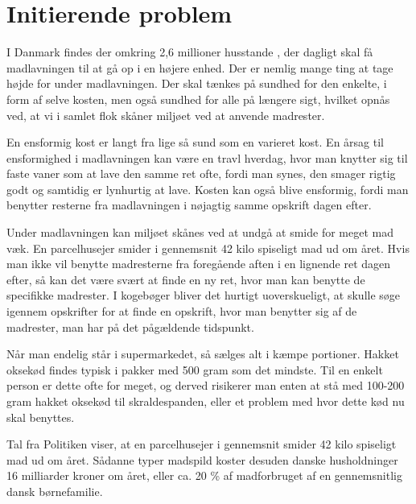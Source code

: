 \section{Initierende problem}
\label{sec:initierendeproblem}

I Danmark findes der omkring 2,6 millioner husstande \cite{husstande}, der dagligt skal få madlavningen til at gå op i en højere enhed. Der er nemlig mange ting at tage højde for under madlavningen. Der skal tænkes på sundhed for den enkelte, i form af selve kosten, men også sundhed for alle på længere sigt, hvilket opnås ved, at vi i samlet flok skåner miljøet ved at anvende madrester.

En ensformig kost er langt fra lige så sund som en varieret kost. En årsag til ensformighed i madlavningen kan være en travl hverdag, hvor man knytter sig til faste vaner som \fx at lave den samme ret ofte, fordi man synes, den smager rigtig godt og samtidig er lynhurtig at lave. Kosten kan også blive ensformig, fordi man benytter resterne fra madlavningen i nøjagtig samme opskrift dagen efter.

Under madlavningen kan miljøet skånes ved at undgå at smide for meget mad væk. En parcelhusejer smider i gennemsnit 42 kilo spiseligt mad ud om året. \cite{madspildpol} Hvis man ikke vil benytte madresterne fra foregående aften i en lignende ret dagen efter, så kan det være svært at finde en ny ret, hvor man kan benytte de specifikke madrester. I kogebøger bliver det hurtigt uoverskueligt, at skulle søge igennem opskrifter for at finde en opskrift, hvor man benytter sig af de madrester, man har på det pågældende tidspunkt. 

Når man endelig står i supermarkedet, så sælges alt i kæmpe portioner. Hakket oksekød findes typisk i pakker med 500 gram som det mindste. Til en enkelt person er dette ofte for meget, og derved risikerer man enten at stå med 100-200 gram hakket oksekød til skraldespanden, eller et problem med hvor dette kød nu skal benyttes.

Tal fra Politiken viser, at en parcelhusejer i gennemsnit smider 42 kilo spiseligt mad ud om året. \cite{madspildpol}
Sådanne typer madspild koster desuden danske husholdninger 16 milliarder kroner om året, eller ca. 20 \% af madforbruget af en gennemsnitlig dansk børnefamilie. \cite{madspild16}

